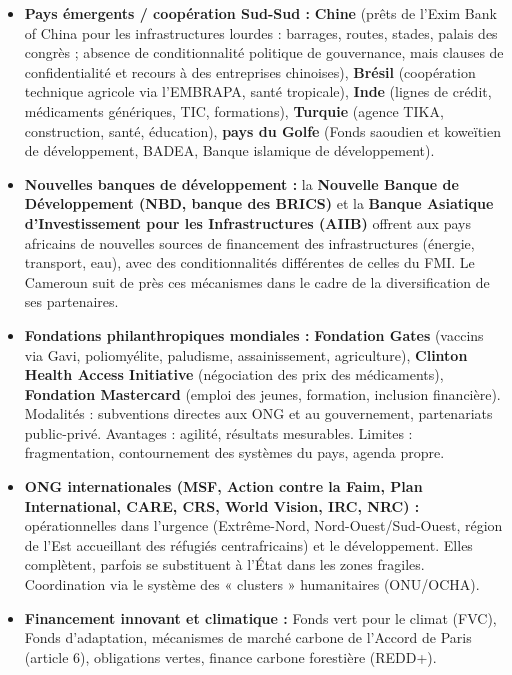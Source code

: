 \documentclass[11pt]{article}
\begin{document}
\begin{itemize}
    \item \textbf{Pays émergents / coopération Sud-Sud :} \textbf{Chine} (prêts de l'Exim Bank of China pour les infrastructures lourdes : barrages, routes, stades, palais des congrès ; absence de conditionnalité politique de gouvernance, mais clauses de confidentialité et recours à des entreprises chinoises), \textbf{Brésil} (coopération technique agricole via l'EMBRAPA, santé tropicale), \textbf{Inde} (lignes de crédit, médicaments génériques, TIC, formations), \textbf{Turquie} (agence TIKA, construction, santé, éducation), \textbf{pays du Golfe} (Fonds saoudien et koweïtien de développement, BADEA, Banque islamique de développement).
    \item \textbf{Nouvelles banques de développement :} la \textbf{Nouvelle Banque de Développement (NBD, banque des BRICS)} et la \textbf{Banque Asiatique d'Investissement pour les Infrastructures (AIIB)} offrent aux pays africains de nouvelles sources de financement des infrastructures (énergie, transport, eau), avec des conditionnalités différentes de celles du FMI. Le Cameroun suit de près ces mécanismes dans le cadre de la diversification de ses partenaires.
    \item \textbf{Fondations philanthropiques mondiales :} \textbf{Fondation Gates} (vaccins via Gavi, poliomyélite, paludisme, assainissement, agriculture), \textbf{Clinton Health Access Initiative} (négociation des prix des médicaments), \textbf{Fondation Mastercard} (emploi des jeunes, formation, inclusion financière). Modalités : subventions directes aux ONG et au gouvernement, partenariats public-privé. Avantages : agilité, résultats mesurables. Limites : fragmentation, contournement des systèmes du pays, agenda propre.
    \item \textbf{ONG internationales (MSF, Action contre la Faim, Plan International, CARE, CRS, World Vision, IRC, NRC) :} opérationnelles dans l'urgence (Extrême-Nord, Nord-Ouest/Sud-Ouest, région de l'Est accueillant des réfugiés centrafricains) et le développement. Elles complètent, parfois se substituent à l'État dans les zones fragiles. Coordination via le système des « clusters » humanitaires (ONU/OCHA).
    \item \textbf{Financement innovant et climatique :} Fonds vert pour le climat (FVC), Fonds d'adaptation, mécanismes de marché carbone de l'Accord de Paris (article 6), obligations vertes, finance carbone forestière (REDD+).
\end{itemize}
\end{document}
